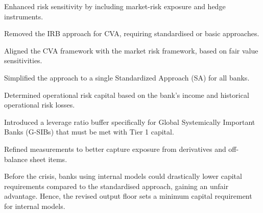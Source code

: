 \begin{lettered}
\item Enhanced risk sensitivity by including market-risk exposure and hedge
instruments.
\item Removed the IRB approach for CVA, requiring standardised or basic
approaches.
\item Aligned the CVA framework with the market risk framework, based on fair
value sensitivities.
\end{lettered}

\begin{lettered}
\item Simplified the approach to a single Standardized Approach (SA) for all
banks.
\item Determined operational risk capital based on the bank's income and
historical operational risk losses.
\end{lettered}

\begin{lettered}
\item Introduced a leverage ratio buffer specifically for Global Systemically
Important Banks (G-SIBs) that must be met with Tier 1 capital.
\item Refined measurements to better capture exposure from derivatives and
off-balance sheet items.
\end{lettered}


Before the crisis, banks using internal models could drastically lower capital
requirements compared to the standardised approach, gaining an unfair advantage.
Hence, the revised output floor sets a minimum capital requirement for internal
models.


